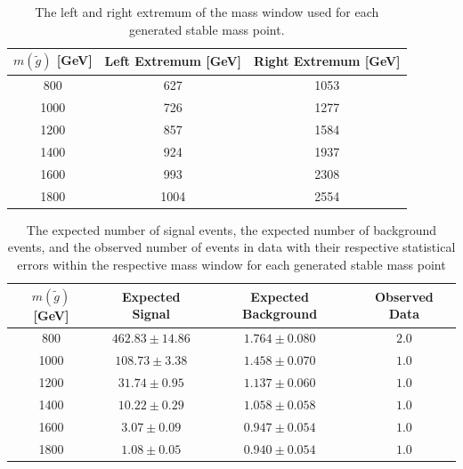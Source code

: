 \begin{table}[!htbp]
  \begin{center}
    \begin{tabular}{ccc}
        \hline
        $m(\tilde{g})$ [GeV]  & Left Extremum [GeV] & Right Extremum [GeV] \\
        \hline
        800    & 627 & 1053 \\
        1000    & 726 & 1277 \\
        1200    & 857 & 1584 \\
        1400    & 924 & 1937 \\
        1600    & 993 & 2308 \\
        1800    & 1004 & 2554 \\
        \hline
    \end{tabular}
  \end{center}
  \caption{The left and right extremum of the mass window used for each generated stable mass point.}
  \label{tab:window_stable}
\end{table}

\begin{table}[!htbp]
  \begin{center}
    \begin{tabular}{c|c|c|c}
      \hline
      $m(\tilde{g})$ [GeV]  & Expected Signal & Expected Background & Observed Data\\
      \hline
      800    & $462.83 \pm 14.86 $ & $1.764 \pm 0.080 $ & $2.0$ \\
      1000   & $108.73 \pm 3.38 $  & $1.458 \pm 0.070 $ & $1.0$ \\
      1200   & $31.74 \pm 0.95 $   & $1.137 \pm 0.060 $ & $1.0$ \\
      1400   & $10.22 \pm 0.29 $   & $1.058 \pm 0.058 $ & $1.0$ \\
      1600   & $3.07 \pm 0.09 $    & $0.947 \pm 0.054 $ & $1.0$ \\
      1800   & $1.08 \pm 0.05 $    & $0.940 \pm 0.054 $ & $1.0$ \\
      \hline
    \end{tabular}
  \end{center} 
  \caption{The expected number of signal events, the expected number of background events, and the observed number of events in data with their respective statistical errors within the respective mass window for each generated stable mass point}
  \label{tab:counts_stable}
\end{table}

